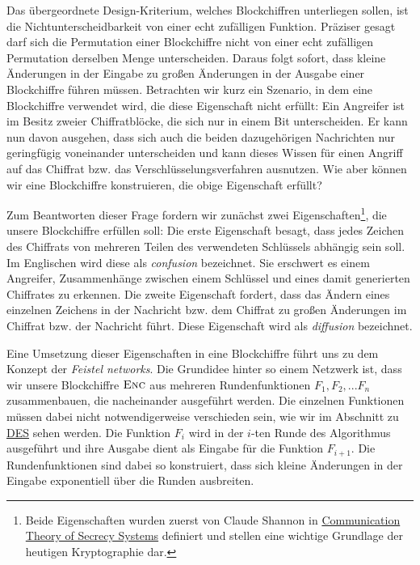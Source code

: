 Das übergeordnete Design-Kriterium, welches Blockchiffren unterliegen sollen, ist die Nichtunterscheidbarkeit von einer echt zufälligen Funktion. Präziser gesagt darf sich die Permutation einer Blockchiffre nicht von einer echt zufälligen Permutation derselben Menge unterscheiden. Daraus folgt sofort, dass kleine Änderungen in der Eingabe zu großen Änderungen in der Ausgabe einer Blockchiffre führen müssen. Betrachten wir kurz ein Szenario, in dem eine Blockchiffre verwendet wird, die diese Eigenschaft nicht erfüllt: Ein Angreifer ist im Besitz zweier Chiffratblöcke, die sich nur in einem Bit unterscheiden. Er kann nun davon ausgehen, dass sich auch die beiden dazugehörigen Nachrichten nur geringfügig voneinander unterscheiden und kann dieses Wissen für einen Angriff auf das Chiffrat bzw. das Verschlüsselungsverfahren ausnutzen. Wie aber können wir eine Blockchiffre konstruieren, die obige Eigenschaft erfüllt?

Zum Beantworten dieser Frage fordern wir zunächst zwei Eigenschaften\footnote{Beide Eigenschaften wurden zuerst von Claude Shannon in \href{http://netlab.cs.ucla.edu/wiki/files/shannon1949.pdf}{Communication Theory of Secrecy Systems} definiert und stellen eine wichtige Grundlage der heutigen Kryptographie dar.}, die unsere Blockchiffre erfüllen soll:
Die erste Eigenschaft besagt, dass jedes Zeichen des Chiffrats von mehreren Teilen des verwendeten Schlüssels abhängig sein soll. Im Englischen wird diese als \textit{confusion} bezeichnet. Sie erschwert es einem Angreifer, Zusammenhänge zwischen einem Schlüssel und eines damit generierten Chiffrates zu erkennen.
Die zweite Eigenschaft fordert, dass das Ändern eines einzelnen Zeichens in der Nachricht bzw. dem Chiffrat zu großen Änderungen im Chiffrat bzw. der Nachricht führt. Diese Eigenschaft wird als \textit{diffusion} bezeichnet.


Eine Umsetzung dieser Eigenschaften in eine Blockchiffre führt uns zu dem Konzept der \textit{Feistel networks}.
Die Grundidee hinter so einem Netzwerk ist, dass wir unsere Blockchiffre \(\textsc{Enc}\) aus mehreren Rundenfunktionen \(F_1, F_2,...F_n\) zusammenbauen, die nacheinander ausgeführt werden. Die einzelnen Funktionen müssen dabei nicht notwendigerweise verschieden sein, wie wir im Abschnitt zu \hyperref[sssec:des]{DES} sehen werden. Die Funktion \(F_i\) wird in der $i$-ten Runde des Algorithmus ausgeführt und ihre Ausgabe dient als Eingabe für die Funktion \(F_{i+1}\). Die Rundenfunktionen sind dabei so konstruiert, dass sich kleine Änderungen in der Eingabe exponentiell über die Runden ausbreiten.

